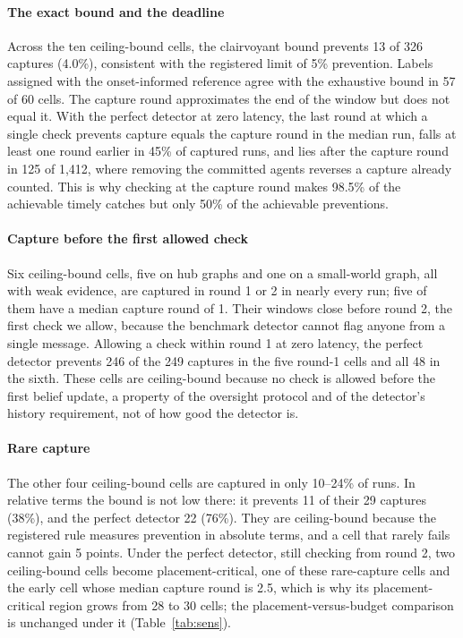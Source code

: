 \documentclass[pdflatex,sn-mathphys-num]{sn-jnl}
\theoremstyle{thmstyleone}%
\begin{document}
\paragraph{The exact bound and the deadline}
Across the ten ceiling-bound cells, the clairvoyant bound prevents 13 of 326 captures (4.0\%), consistent with the registered limit of 5\% prevention. Labels assigned with the onset-informed reference agree with the exhaustive bound in 57 of 60 cells. The capture round approximates the end of the window but does not equal it. With the perfect detector at zero latency, the last round at which a single check prevents capture equals the capture round in the median run, falls at least one round earlier in 45\% of captured runs, and lies after the capture round in 125 of 1{,}412, where removing the committed agents reverses a capture already counted. This is why checking at the capture round makes 98.5\% of the achievable timely catches but only 50\% of the achievable preventions.

\paragraph{Capture before the first allowed check}
Six ceiling-bound cells, five on hub graphs and one on a small-world graph, all with weak evidence, are captured in round 1 or 2 in nearly every run; five of them have a median capture round of 1. Their windows close before round 2, the first check we allow, because the benchmark detector cannot flag anyone from a single message. Allowing a check within round 1 at zero latency, the perfect detector prevents 246 of the 249 captures in the five round-1 cells and all 48 in the sixth. These cells are ceiling-bound because no check is allowed before the first belief update, a property of the oversight protocol and of the detector's history requirement, not of how good the detector is.

\paragraph{Rare capture}
The other four ceiling-bound cells are captured in only 10--24\% of runs. In relative terms the bound is not low there: it prevents 11 of their 29 captures (38\%), and the perfect detector 22 (76\%). They are ceiling-bound because the registered rule measures prevention in absolute terms, and a cell that rarely fails cannot gain 5 points. Under the perfect detector, still checking from round 2, two ceiling-bound cells become placement-critical, one of these rare-capture cells and the early cell whose median capture round is 2.5, which is why its placement-critical region grows from 28 to 30 cells; the placement-versus-budget comparison is unchanged under it (Table~\ref{tab:sens}).
\end{document}
